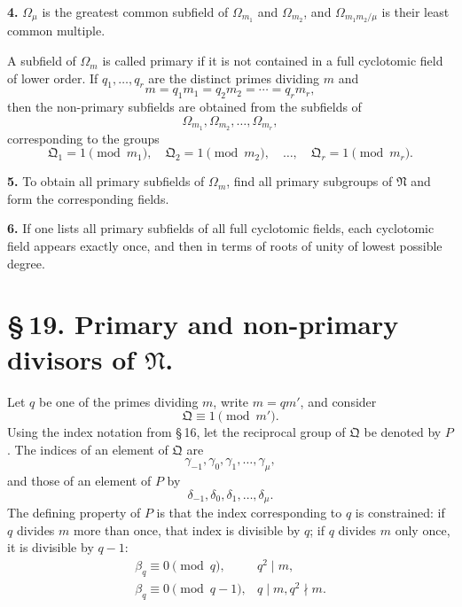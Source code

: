 \documentclass[11pt]{article}
\providecommand{\grpN}{\mathfrak N}
\providecommand{\grpQ}{\mathfrak Q}
\begin{document}
\medskip
\noindent\textbf{4.} $\Omega_\mu$ is the greatest common subfield of $\Omega_{m_1}$ and $\Omega_{m_2}$, and $\Omega_{m_1m_2/\mu}$ is their least common multiple.

A subfield of $\Omega_m$ is called primary if it is not contained in a full cyclotomic field of lower order. If $q_1,
\ldots,q_r$ are the distinct primes dividing $m$ and
\begin{equation}
 m=q_1m_1=q_2m_2=\cdots=q_rm_r,
\tag{8}
\end{equation}
then the non-primary subfields are obtained from the subfields of
\begin{equation}
 \Omega_{m_1},\Omega_{m_2},
\ldots,\Omega_{m_r},
\tag{9}
\end{equation}
corresponding to the groups
\begin{equation}
 \grpQ_1=1\pmod {m_1},\quad
 \grpQ_2=1\pmod {m_2},\quad
 \ldots,
 \quad\grpQ_r=1\pmod {m_r}.
\tag{10}
\end{equation}

\medskip
\noindent\textbf{5.} To obtain all primary subfields of $\Omega_m$, find all primary subgroups of $\grpN$ and form the corresponding fields.

\medskip
\noindent\textbf{6.} If one lists all primary subfields of all full cyclotomic fields, each cyclotomic field appears exactly once, and then in terms of roots of unity of lowest possible degree.

\section*{\S\,19. Primary and non-primary divisors of $\grpN$.}

Let $q$ be one of the primes dividing $m$, write $m=qm'$, and consider
\[
 \grpQ\equiv1\pmod {m'}.
\]
Using the index notation from \S\,16, let the reciprocal group of $\grpQ$ be denoted by $P$. The indices of an element of $\grpQ$ are
\[
 \gamma_{-1},\gamma_0,
\gamma_1,
\ldots,
\gamma_\mu,
\]
and those of an element of $P$ by
\[
 \delta_{-1},\delta_0,
\delta_1,
\ldots,
\delta_\mu.
\]
The defining property of $P$ is that the index corresponding to $q$ is constrained: if $q$ divides $m$ more than once, that index is divisible by $q$; if $q$ divides $m$ only once, it is divisible by $q-1$:
\begin{equation}
\begin{array}{ll}
 \beta_q\equiv0\pmod q,& q^2\mid m,\\
 \beta_q\equiv0\pmod {q-1},& q\mid m,
 q^2\nmid m.
\end{array}
\tag{1}
\end{equation}
\end{document}
